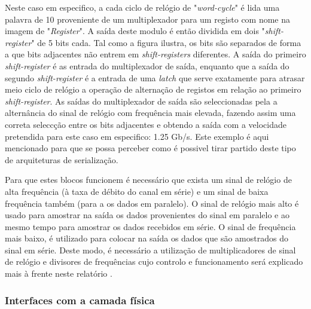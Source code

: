 Neste caso em especifico, a cada ciclo de relógio de "\textit{word-cycle}" é lida uma palavra de 10 proveniente de um multiplexador para um registo com nome na imagem de "\textit{Register}". A saída deste modulo é então dividida em dois "\textit{shift-register}"  de 5 bits cada. Tal como a figura ilustra, os bits são separados de forma a que bits adjacentes não entrem em \textit{shift-registers} diferentes. A saída do primeiro \textit{shift-register} é as entrada do multiplexador de saída, enquanto que a saída do segundo \textit{shift-register} é a entrada de uma \textit{latch} que serve exatamente para atrasar meio ciclo de relógio a operação de alternação de registos em relação ao primeiro \textit{shift-register}. As saídas do multiplexador de saída são seleccionadas pela a alternância do sinal de relógio com frequência mais elevada, fazendo assim uma correta seleccção entre os bits adjacentes e obtendo a saída com a velocidade pretendida para este caso em especifico: 1.25 Gb/s. Este exemplo é aqui mencionado para que se possa perceber como é possivel tirar partido deste tipo de arquiteturas de serialização.
%


Para que estes blocos funcionem é necessário que exista um sinal de relógio de alta frequência (à taxa de débito do canal em série) e um sinal de baixa frequência também (para a os dados em paralelo). O sinal de relógio mais alto é usado para amostrar na saída os dados provenientes do sinal em paralelo e ao mesmo tempo para amostrar os dados recebidos em série. O sinal de frequência mais baixo, é utilizado para colocar na saída os dados que são amostrados do sinal em série. Deste modo, é necessário a utilização de multiplicadores de sinal de relógio e divisores de frequências cujo controlo e funcionamento será explicado mais à frente neste relatório .


\subsubsection*{Interfaces com a camada física}

